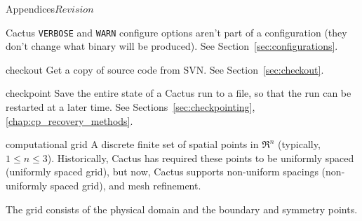 \begin{cactuspart}{Appendices}{}{$Revision$}
\begin{Lentry}
  Cactus \verb|VERBOSE| and \verb|WARN| configure options aren't part
  of a configuration (they don't change what binary will be produced).
  See Section~\ref{sec:configurations}.
\item[checkout]
  Get a copy of source code from SVN.  See Section~\ref{sec:checkout}.
\item[checkpoint]
  Save the entire state of a Cactus run to a file, so that the run can be
  restarted at a later time.
  See Sections~\ref{sec:checkpointing}, \ref{chap:cp_recovery_methods}.
\item[computational grid]
  A discrete finite set of spatial points in $\Re^n$
  (typically, $1 \le n \le 3$).
  Historically, Cactus has required these points to be uniformly spaced
  (uniformly spaced grid), but now, Cactus
  supports non-uniform spacings (non-uniformly spaced grid), and mesh refinement.

  The grid consists of the physical domain and the boundary and symmetry
  points.


\end{Lentry}
\end{cactuspart}
